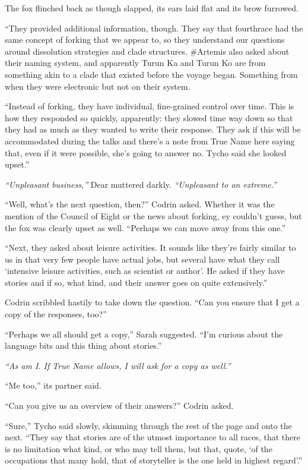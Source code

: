 The fox flinched back as though slapped, its ears laid flat and its brow furrowed.

``They provided additional information, though. They say that fourthrace had the same concept of forking that we appear to, so they understand our questions around dissolution strategies and clade structures. \#Artemis also asked about their naming system, and apparently Turun Ka and Turun Ko are from something akin to a clade that existed before the voyage began. Something from when they were electronic but not on their system.

``Instead of forking, they have individual, fine-grained control over time. This is how they responded so quickly, apparently: they slowed time way down so that they had as much as they wanted to write their response. They ask if this will be accommodated during the talks and there's a note from True Name here saying that, even if it were possible, she's going to answer no. Tycho said she looked upset.''

\emph{``Unpleasant business,''} Dear muttered darkly. \emph{``Unpleasant to an extreme.''}

``Well, what's the next question, then?'' Codrin asked. Whether it was the mention of the Council of Eight or the news about forking, ey couldn't guess, but the fox was clearly upset as well. ``Perhaps we can move away from this one.''

``Next, they asked about leisure activities. It sounds like they're fairly similar to us in that very few people have actual jobs, but several have what they call `intensive leisure activities, such as scientist or author'. He asked if they have stories and if so, what kind, and their answer goes on quite extensively.''

Codrin scribbled hastily to take down the question. ``Can you ensure that I get a copy of the responses, too?''

``Perhaps we all should get a copy,'' Sarah suggested. ``I'm curious about the language bits and this thing about stories.''

\emph{``As am I. If True Name allows, I will ask for a copy as well.''}

``Me too,'' its partner said.

``Can you give us an overview of their answers?'' Codrin asked.

``Sure,'' Tycho said slowly, skimming through the rest of the page and onto the next. ``They say that stories are of the utmost importance to all races, that there is no limitation what kind, or who may tell them, but that, quote, `of the occupations that many hold, that of storyteller is the one held in highest regard'.''

